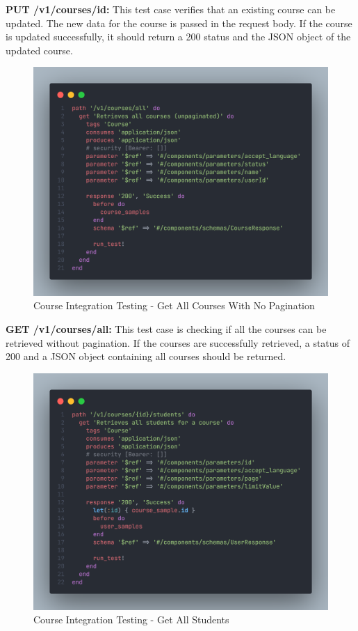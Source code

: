 \begin{justify}
\noindent \textbf{PUT /v1/courses/{id}:} This test case verifies that an existing course can be updated. The new data for the course is passed in the request body. If the course is updated successfully, it should return a 200 status and the JSON object of the updated course.

\begin{figure}[H]
    \centerline{\includegraphics[width=150mm,scale=1]{figures/implementation_and_testing/testing/AIT/get_v1_all.png}}
    \caption{Course Integration Testing - Get All Courses With No Pagination}
    \label{Course Integration Testing - Get All Courses With No Pagination}
\end{figure}


\noindent \textbf{GET /v1/courses/all:} This test case is checking if all the courses can be retrieved without pagination. If the courses are successfully retrieved, a status of 200 and a JSON object containing all courses should be returned.

\begin{figure}[H]
    \centerline{\includegraphics[width=150mm,scale=1]{figures/implementation_and_testing/testing/AIT/get_v1_students.png}}
    \caption{Course Integration Testing - Get All Students}
    \label{Course Integration Testing - Get All Students}
\end{figure}


\end{justify}
